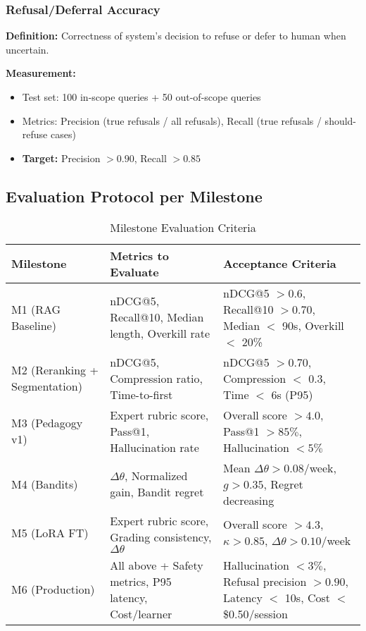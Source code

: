 \documentclass[11pt,letterpaper]{article}
\begin{document}
\subsubsection{Refusal/Deferral Accuracy}

\textbf{Definition:} Correctness of system's decision to refuse or defer to human when uncertain.

\textbf{Measurement:}
\begin{itemize}
\item Test set: 100 in-scope queries + 50 out-of-scope queries
\item Metrics: Precision (true refusals / all refusals), Recall (true refusals / should-refuse cases)
\item \textbf{Target:} Precision $> 0.90$, Recall $> 0.85$
\end{itemize}

\subsection{Evaluation Protocol per Milestone}

\begin{table}[H]
\centering
\small
\begin{tabular}{@{}p{2.5cm}p{6cm}p{5.5cm}@{}}
\toprule
\textbf{Milestone} & \textbf{Metrics to Evaluate} & \textbf{Acceptance Criteria} \\
\midrule
M1 (RAG Baseline) & nDCG@5, Recall@10, Median length, Overkill rate & nDCG@5 $> 0.6$, Recall@10 $> 0.70$, Median $<$ 90s, Overkill $<$ 20\% \\
M2 (Reranking + Segmentation) & nDCG@5, Compression ratio, Time-to-first & nDCG@5 $> 0.70$, Compression $<$ 0.3, Time $<$ 6s (P95) \\
M3 (Pedagogy v1) & Expert rubric score, Pass@1, Hallucination rate & Overall score $> 4.0$, Pass@1 $> 85\%$, Hallucination $< 5\%$ \\
M4 (Bandits) & $\Delta\theta$, Normalized gain, Bandit regret & Mean $\Delta\theta > 0.08$/week, $g > 0.35$, Regret decreasing \\
M5 (LoRA FT) & Expert rubric score, Grading consistency, $\Delta\theta$ & Overall score $> 4.3$, $\kappa > 0.85$, $\Delta\theta > 0.10$/week \\
M6 (Production) & All above + Safety metrics, P95 latency, Cost/learner & Hallucination $< 3\%$, Refusal precision $> 0.90$, Latency $<$ 10s, Cost $<$ \$0.50/session \\
\bottomrule
\end{tabular}
\caption{Milestone Evaluation Criteria}
\end{table}
\end{document}
